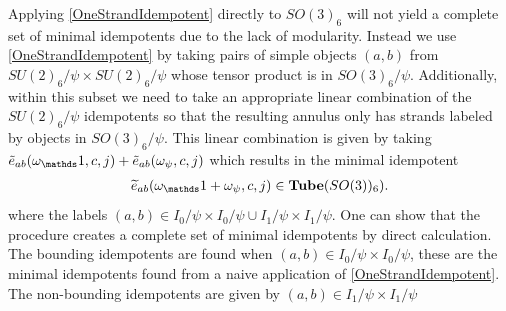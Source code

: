 Applying \eqref{OneStrandIdempotent} directly to $SO(3)_6$ will not yield a complete set of minimal idempotents due to the lack of modularity. 
Instead we use  \eqref{OneStrandIdempotent} by taking pairs of simple objects $(a,b)$ from $SU(2)_6/\psi \times SU(2)_6/\psi$ whose tensor product is in $SO(3)_6/\psi$.
Additionally, within this subset we need to take an appropriate linear combination of the $SU(2)_6/\psi$ idempotents so that the resulting annulus only has strands labeled by objects in $SO(3)_6/\psi$.
This linear combination is given by taking $\tilde{e}_{ab}(\omega_\unit, c,j)+\tilde{e}_{ab}(\omega_\psi, c,j)$ which results in the minimal idempotent
\begin{align}
\widetilde{e}_{ab}( \omega_\unit + \omega_\psi,c,j) \in \tube(SO(3))_6).
\end{align}
where the labels $(a,b) \in I_0/\psi \times I_0/\psi \cup I_1/\psi \times I_1/\psi$.
One can show that the procedure creates a complete set of minimal idempotents by direct calculation. 
The bounding idempotents are found when $(a,b) \in I_0/\psi \times I_0/\psi$, 
these are the minimal idempotents found from a naive application of \eqref{OneStrandIdempotent}. 
The non-bounding idempotents are given by $(a,b) \in I_1/\psi \times I_1/\psi$

